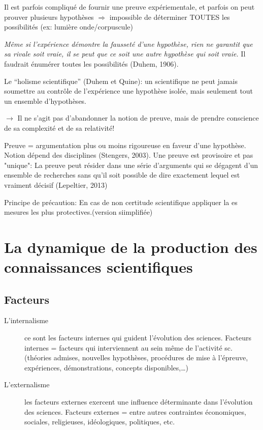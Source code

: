 \documentclass{report}
\begin{document}
	Il est parfois compliqué de fournir une preuve expériementale, et parfois on peut prouver plusieurs hypothèses $\Rightarrow$ impossible de déterminer TOUTES les possibilités (ex: lumière onde/corpuscule)
	
	\emph{Même si l’expérience démontre la fausseté d’une hypothèse, rien ne garantit que sa rivale soit vraie, il se peut que ce soit une autre hypothèse qui soit vraie.} Il faudrait énumérer toutes les possibilités (Duhem, 1906).
	
	Le “holisme scientifique” (Duhem et Quine): un scientifique ne peut jamais soumettre au contrôle de l'expérience une hypothèse isolée, mais seulement tout un ensemble d'hypothèses.
	
	$\rightarrow$ Il ne s’agit pas d’abandonner la notion de preuve, mais de prendre conscience de sa complexité et de sa relativité!
	
	Preuve = argumentation plus ou moins rigoureuse en faveur d’une hypothèse. Notion dépend des disciplines (Stengers, 2003). Une preuve est provisoire et pas "unique": La preuve peut résider \og dans une série d’arguments qui se dégagent d’un ensemble de recherches sans qu’il soit possible de dire exactement lequel est vraiment décisif \fg (Lepeltier, 2013)
	
	Principe de précaution: En cas de non certitude scientifique appliquer la es mesures les plus protectives.(version siimplifiée)
	
	
	\chapter[Dynamique des connaissances scientifiques]{La dynamique de la production des connaissances scientifiques}
	
	\section{Facteurs}
	
	\begin{description}
		\item[L’internalisme] ce sont les facteurs internes qui guident l’évolution des sciences. Facteurs internes = facteurs qui interviennent au sein même de l’activité sc. (théories admises, nouvelles hypothèses, procédures de mise à l’épreuve, expériences, démonstrations, concepts disponibles,…)
		\item[L’externalisme] les facteurs externes exercent une influence déterminante dans l’évolution des sciences. Facteurs externes = entre autres contraintes économiques, sociales, religieuses, idéologiques, politiques, etc.
	\end{description}
	
\end{document}
